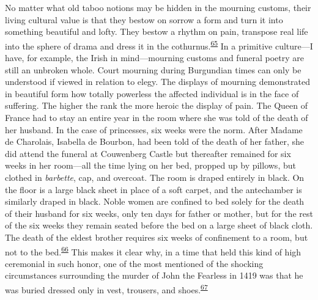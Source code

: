 No matter what old taboo notions may be hidden in the mourning customs,
their living cultural value is that they bestow on sorrow a form and
turn it into something beautiful and lofty. They bestow a rhythm on
pain, transpose real life into the sphere of drama and dress it in the
cothurnus.\textsuperscript{\protect\hypertarget{09_Chapter_Two__THE_CRAVING_FOR_A_M.xhtmlux5cux23id_1958}{\protect\hyperlink{23_NOTES.xhtmlux5cux23id_1959}{65}}}
In a primitive culture---I have, for example, the Irish in
mind---mourning customs and funeral poetry are still an unbroken whole.
Court mourning during Burgundian times can only be understood if viewed
in relation to elegy. The displays of mourning demonstrated in beautiful
form how totally powerless the affected individual is in the face of
suffering. The higher the rank the more heroic the display of pain. The
Queen of France had to stay an entire year in the room where she was
told of the death of her husband. In the case of princesses, six weeks
were the norm. After Madame de Charolais, Isabella de Bourbon, had been
told of the death of her father, she did attend the funeral at
Couwenberg Castle but thereafter remained for six
\protect\hypertarget{09_Chapter_Two__THE_CRAVING_FOR_A_M.xhtmlux5cux23page_57}{}{}weeks
in her room---all the time lying on her bed, propped up by pillows, but
clothed in \emph{barbette}, cap, and overcoat. The room is draped
entirely in black. On the floor is a large black sheet in place of a
soft carpet, and the antechamber is similarly draped in black. Noble
women are confined to bed solely for the death of their husband for six
weeks, only ten days for father or mother, but for the rest of the six
weeks they remain seated before the bed on a large sheet of black cloth.
The death of the eldest brother requires six weeks of confinement to a
room, but not to the
bed.\textsuperscript{\protect\hypertarget{09_Chapter_Two__THE_CRAVING_FOR_A_M.xhtmlux5cux23id_1956}{\protect\hyperlink{23_NOTES.xhtmlux5cux23id_1957}{66}}}
This makes it clear why, in a time that held this kind of high
ceremonial in such honor, one of the most mentioned of the shocking
circumstances surrounding the murder of John the Fearless in 1419 was
that he was buried dressed only in vest, trousers, and
shoes.\textsuperscript{\protect\hypertarget{09_Chapter_Two__THE_CRAVING_FOR_A_M.xhtmlux5cux23id_1954}{\protect\hyperlink{23_NOTES.xhtmlux5cux23id_1955}{67}}}

